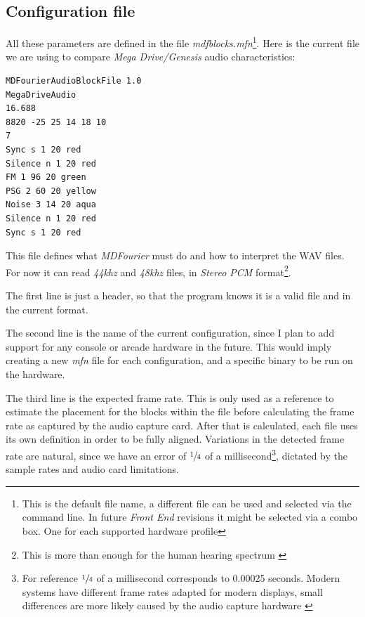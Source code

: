 \documentclass[10pt,a4paper]{report}
\begin{document}
\begin{appendices}
	
\chapter{Configuration file}
\label{mfnconfig}

All these parameters are defined in the file \textit{mdfblocks.mfn}\footnote{This is the default file name, a different file can be used and selected via the command line. In future \textit{Front End} revisions it might be selected via a combo box. One for each supported hardware profile}. Here is the current file we are using to compare \textit{Mega Drive/Genesis} audio characteristics:

\begin{verbatim}
MDFourierAudioBlockFile 1.0
MegaDriveAudio
16.688
8820 -25 25 14 18 10
7
Sync s 1 20 red
Silence n 1 20 red
FM 1 96 20 green
PSG 2 60 20 yellow
Noise 3 14 20 aqua
Silence n 1 20 red
Sync s 1 20 red
\end{verbatim}

This file defines what \textit{MDFourier} must do and how to interpret the WAV files. For now it can read \textit{44khz} and \textit{48khz} files, in \textit{Stereo PCM} format\footnote{This is more than enough for the human hearing spectrum \cite{MontyMontgomery}}.

The first line is just a header, so that the program knows it is a valid file and in the current format.

The second line is the name of the current configuration, since I plan to add support for any console or arcade hardware in the future. This would imply creating a new \textit{mfn} file for each configuration, and a specific binary to be run on the hardware.

The third line is the expected frame rate. This is only used as a reference to estimate the placement for the blocks within the file before calculating the frame rate as captured by the audio capture card. After that is calculated, each file uses its own definition in order to be fully aligned. Variations in the detected frame rate are natural, since we have an error of $\sfrac{1}{4}$ of a millisecond\footnote{For reference $\sfrac{1}{4}$ of a millisecond corresponds to 0.00025 seconds. Modern systems have different frame rates adapted for modern displays, small differences are more likely caused by the audio capture hardware \cite{SoundCardClock}}, dictated by the sample rates and audio card limitations.


\end{appendices}
\end{document}

